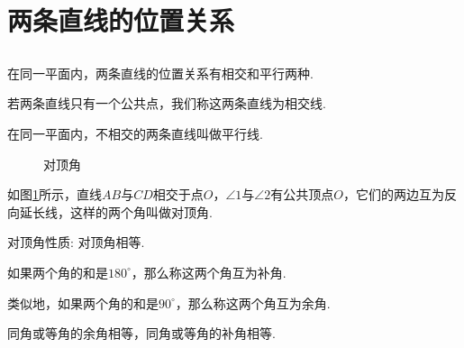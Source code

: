 \documentclass[fontset=windows]{ctexrep}
\begin{document}
\section{两条直线的位置关系}
\subsection{}
\par 在同一平面内，两条直线的位置关系有相交和平行两种.
\par 若两条直线只有一个公共点，我们称这两条直线为{\heiti 相交线}.
\par 在同一平面内，不相交的两条直线叫做{\heiti 平行线}.
\begin{figure}[htbp]
    \centering
    \caption{对顶角}
    \label{fig:vertical-angles}
\end{figure}
\par 如图\ref{fig:vertical-angles}所示，直线$AB$与$CD$相交于点$O$，$\angle 1$与$\angle 2$有公共顶点$O$，它们的两边互为反向延长线，这样的两个角叫做{\heiti 对顶角}.
\par 对顶角性质: 对顶角相等.
\par 如果两个角的和是$180^\circ$，那么称这两个角互为{\heiti 补角}.
\par 类似地，如果两个角的和是$90^\circ$，那么称这两个角互为{\heiti 余角}.
\par 同角或等角的余角相等，同角或等角的补角相等.
\end{document}
